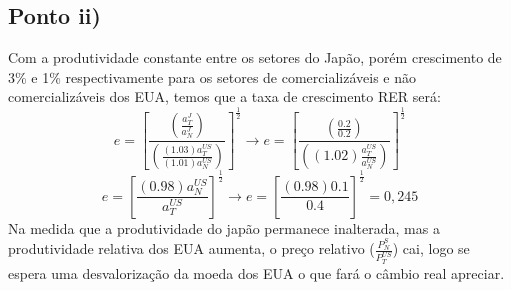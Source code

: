 \documentclass{article}
\begin{document}
\subsection*{Ponto ii)}
Com a produtividade constante entre os setores do Japão, porém crescimento de 3\% e 1\% respectivamente para os setores de comercializáveis e não comercializáveis dos EUA, temos que a taxa de crescimento RER será:
\begin{equation*}
    e=\left[\frac{\left(\frac{a_T^J}{a_N^J}\right)}{\left(\frac{(1.03)a_T^{US}}{(1.01)a_N^{US}}\right)}\right]^\frac{1}{2} \to 
    e=\left[\frac{\left(\frac{0.2}{0.2}\right)}{\left((1.02)\frac{a_T^{US}}{a_N^{US}}\right)}\right]^\frac{1}{2}
\end{equation*}
\begin{equation*}
    e=\left[\frac{(0.98)a_N^{US}}{a_T^{US}}\right]^\frac{1}{2} \to 
    e=\left[\frac{(0.98)0.1}{0.4}\right]^\frac{1}{2}=0,245
\end{equation*}
Na medida que a produtividade do japão permanece inalterada, mas a produtividade relativa dos EUA aumenta, o preço relativo ($\frac{P_N^{S}}{P_T^{US}}$) cai, logo se espera uma desvalorização da moeda dos EUA o que fará o câmbio real apreciar.
\end{document}
